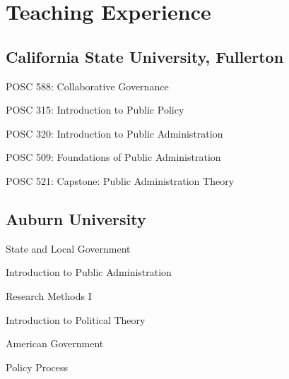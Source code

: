 \documentclass[11pt,letterpaper]{article}
\renewenvironment{itemize}{
  \begin{list}{}{
    \setlength{\leftmargin}{1.5em}
    \setlength{\itemsep}{0.25em}
    \setlength{\parskip}{0pt}
    \setlength{\parsep}{0.25em}
  }
}{
  \end{list}
}
\begin{document}
\section*{Teaching Experience}

\subsection*{California State University, Fullerton}
\begin{itemize}\leftmargin=2pt\itemindent=-15pt
  \item POSC 588: Collaborative Governance
  \item POSC 315: Introduction to Public Policy
  \item POSC 320: Introduction to Public Administration
  \item POSC 509: Foundations of Public Administration
  \item POSC 521: Capstone: Public Administration Theory
\end{itemize}

\subsection*{Auburn University}
\begin{itemize}\leftmargin=2pt\itemindent=-15pt
  \item State and Local Government
  \item Introduction to Public Administration
  \item Research Methods I
  \item Introduction to Political Theory
  \item American Government
  \item Policy Process
\end{itemize}
\end{document}
